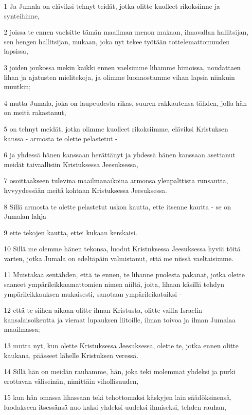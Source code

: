 \par 1 Ja Jumala on eläviksi tehnyt teidät, jotka olitte kuolleet rikoksiinne ja synteihinne,
\par 2 joissa te ennen vaelsitte tämän maailman menon mukaan, ilmavallan hallitsijan, sen hengen hallitsijan, mukaan, joka nyt tekee työtään tottelemattomuuden lapsissa,
\par 3 joiden joukossa mekin kaikki ennen vaelsimme lihamme himoissa, noudattaen lihan ja ajatusten mielitekoja, ja olimme luonnostamme vihan lapsia niinkuin muutkin;
\par 4 mutta Jumala, joka on laupeudesta rikas, suuren rakkautensa tähden, jolla hän on meitä rakastanut,
\par 5 on tehnyt meidät, jotka olimme kuolleet rikoksiimme, eläviksi Kristuksen kanssa - armosta te olette pelastetut -
\par 6 ja yhdessä hänen kanssaan herättänyt ja yhdessä hänen kanssaan asettanut meidät taivaallisiin Kristuksessa Jeesuksessa,
\par 7 osoittaakseen tulevina maailmanaikoina armonsa ylenpalttista runsautta, hyvyydessään meitä kohtaan Kristuksessa Jeesuksessa.
\par 8 Sillä armosta te olette pelastetut uskon kautta, ette itsenne kautta - se on Jumalan lahja -
\par 9 ette tekojen kautta, ettei kukaan kerskaisi.
\par 10 Sillä me olemme hänen tekonsa, luodut Kristuksessa Jeesuksessa hyviä töitä varten, jotka Jumala on edeltäpäin valmistanut, että me niissä vaeltaisimme.
\par 11 Muistakaa sentähden, että te ennen, te lihanne puolesta pakanat, jotka olette saaneet ympärileikkaamattomien nimen niiltä, joita, lihaan käsillä tehdyn ympärileikkauksen mukaisesti, sanotaan ympärileikatuiksi -
\par 12 että te siihen aikaan olitte ilman Kristusta, olitte vailla Israelin kansalaisoikeutta ja vieraat lupauksen liitoille, ilman toivoa ja ilman Jumalaa maailmassa;
\par 13 mutta nyt, kun olette Kristuksessa Jeesuksessa, olette te, jotka ennen olitte kaukana, päässeet lähelle Kristuksen veressä.
\par 14 Sillä hän on meidän rauhamme, hän, joka teki molemmat yhdeksi ja purki erottavan väliseinän, nimittäin vihollisuuden,
\par 15 kun hän omassa lihassaan teki tehottomaksi käskyjen lain säädöksinensä, luodakseen itsessänsä nuo kaksi yhdeksi uudeksi ihmiseksi, tehden rauhan,

